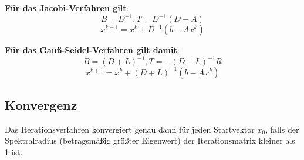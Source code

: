 \noindent\textbf{Für das Jacobi-Verfahren gilt}:
$$B = D^{-1}, T = D^{-1}(D - A)$$$$x^{k+1} = x^k + D^{-1}(b - Ax^k)$$

\noindent\textbf{Für das Gauß-Seidel-Verfahren gilt damit}:
$$B = (D + L)^{-1}, T = -(D + L)^{-1}R$$$$x^{k+1} = x^k + (D + L)^{-1}(b - Ax^k)$$

\subsection{Konvergenz}%
\label{itl:sub:konvergenz}
Das Iterationsverfahren konvergiert genau dann für jeden Startvektor $x_0$, falls der Spektralradius (betragsmäßig größter Eigenwert) der Iterationsmatrix kleiner als 1 ist.
